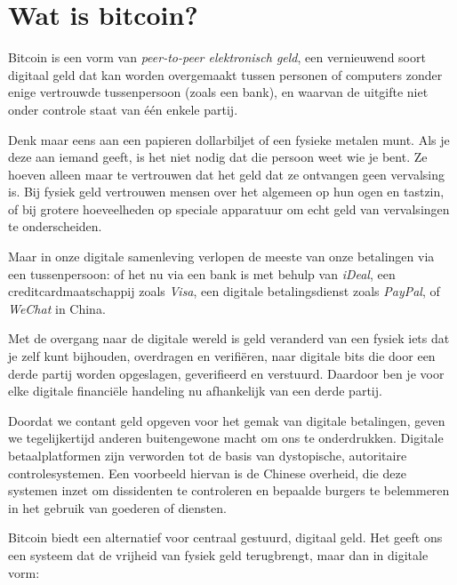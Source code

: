 \chapter{Wat is bitcoin?}

Bitcoin is een vorm van \textit{peer-to-peer elektronisch geld}, een vernieuwend soort digitaal geld dat kan worden overgemaakt tussen personen of computers zonder enige vertrouwde tussenpersoon (zoals een bank), en waarvan de uitgifte niet onder controle staat van één enkele partij. 

Denk maar eens aan een papieren dollarbiljet of een fysieke metalen munt. Als je deze aan iemand geeft, is het niet nodig dat die persoon weet wie je bent. Ze hoeven alleen maar te vertrouwen dat het geld dat ze ontvangen geen vervalsing is. Bij fysiek geld vertrouwen mensen over het algemeen op hun ogen en tastzin, of bij grotere hoeveelheden op speciale apparatuur om echt geld van vervalsingen te onderscheiden.

Maar in onze digitale samenleving verlopen de meeste van onze betalingen via een tussenpersoon: of het nu via een bank is met behulp van \textit{iDeal}, een creditcardmaatschappij zoals \textit{Visa}, een digitale betalingsdienst zoals \textit{PayPal}, of \textit{WeChat} in China.

Met de overgang naar de digitale wereld is geld veranderd van een fysiek iets dat je zelf kunt bijhouden, overdragen en verifiëren, naar digitale bits die door een derde partij worden opgeslagen, geverifieerd en verstuurd. Daardoor ben je voor elke digitale financiële handeling nu afhankelijk van een derde partij. 

Doordat we contant geld opgeven voor het gemak van digitale betalingen, geven we tegelijkertijd anderen buitengewone macht om ons te onderdrukken. Digitale betaalplatformen zijn verworden tot de basis van dystopische, autoritaire controlesystemen. Een voorbeeld hiervan is de Chinese overheid, die deze systemen inzet om dissidenten te controleren en bepaalde burgers te belemmeren in het gebruik van goederen of diensten.

Bitcoin biedt een alternatief voor centraal gestuurd, digitaal geld. Het geeft ons een systeem dat de vrijheid van fysiek geld terugbrengt, maar dan in digitale vorm:

